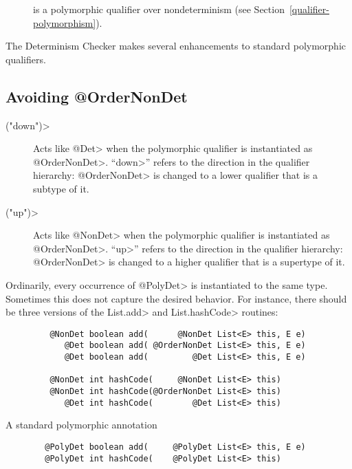 \begin{description}
\item[] is a
  polymorphic qualifier over nondeterminism (see Section~\ref{qualifier-polymorphism}).
\end{description}

The Determinism Checker makes
several enhancements to standard polymorphic qualifiers.


\subsection{Avoiding @OrderNonDet\label{determinism-polymorphism-ordernondet}}

\begin{description}
\item[\<("down")>]
  Acts like \<@Det> when the polymorphic qualifier is instantiated as
  \<@OrderNonDet>.
  ``\<down>'' refers to the direction in the qualifier hierarchy:
  \<@OrderNonDet> is changed to a lower qualifier that is a subtype of it.
\item[\<("up")>]
  Acts like \<@NonDet> when the polymorphic qualifier is instantiated as
  \<@OrderNonDet>.
  ``\<up>'' refers to the direction in the qualifier hierarchy:
  \<@OrderNonDet> is changed to a higher qualifier that is a supertype of it.
\end{description}

Ordinarily, every occurrence of \<@PolyDet> is instantiated to the same
type.  Sometimes this does not capture the desired behavior.  For instance,
there should be three versions of the \<List.add> and \<List.hashCode> routines:

\begin{Verbatim}
         @NonDet boolean add(      @NonDet List<E> this, E e)
            @Det boolean add( @OrderNonDet List<E> this, E e)
            @Det boolean add(         @Det List<E> this, E e)

         @NonDet int hashCode(     @NonDet List<E> this)
         @NonDet int hashCode(@OrderNonDet List<E> this)
            @Det int hashCode(        @Det List<E> this)
\end{Verbatim}

A standard polymorphic annotation

\begin{Verbatim}
        @PolyDet boolean add(     @PolyDet List<E> this, E e)
        @PolyDet int hashCode(    @PolyDet List<E> this)
\end{Verbatim}

